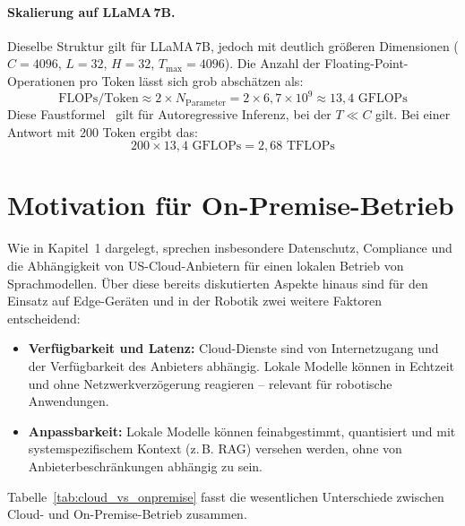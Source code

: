 \paragraph{Skalierung auf LLaMA\,7B.}
Dieselbe Struktur gilt für LLaMA\,7B, jedoch mit deutlich größeren
Dimensionen ($C = 4096$, $L = 32$, $H = 32$, $T_{\max} = 4096$).
Die Anzahl der Floating-Point-Operationen pro Token lässt sich grob
abschätzen als:
\begin{equation}
    \text{FLOPs/Token} \approx 2 \times N_{\text{Parameter}}
    = 2 \times 6{,}7 \times 10^9 \approx 13{,}4 \text{ GFLOPs}
    \label{eq:flops_scaling}
\end{equation}
Diese Faustformel~\cite{kaplan_scaling} gilt für Autoregressive
Inferenz, bei der $T \ll C$ gilt. Bei einer Antwort mit 200 Token
ergibt das:
\begin{equation}
    200 \times 13{,}4 \text{ GFLOPs} = 2{,}68 \text{ TFLOPs}
    \label{eq:llama_flops_total}
\end{equation}


\section{Motivation für On-Premise-Betrieb}
\label{sec:motivation_onpremise}

Wie in Kapitel~1 dargelegt, sprechen insbesondere Datenschutz, Compliance und die Abhängigkeit von US-Cloud-Anbietern für einen lokalen Betrieb von Sprachmodellen. Über diese bereits diskutierten Aspekte hinaus sind für den Einsatz auf Edge-Geräten und in der Robotik zwei weitere Faktoren entscheidend:

\begin{itemize}
    \item \textbf{Verfügbarkeit und Latenz:} Cloud-Dienste sind von
          Internetzugang und der Verfügbarkeit des Anbieters abhängig.
          Lokale Modelle können in Echtzeit und ohne Netzwerkverzögerung
          reagieren -- relevant für robotische Anwendungen.
    \item \textbf{Anpassbarkeit:} Lokale Modelle können feinabgestimmt,
          quantisiert und mit systemspezifischem Kontext (z.\,B. RAG)
          versehen werden, ohne von Anbieterbeschränkungen abhängig zu sein.
\end{itemize}

Tabelle~\ref{tab:cloud_vs_onpremise} fasst die wesentlichen Unterschiede zwischen Cloud- und On-Premise-Betrieb zusammen.

